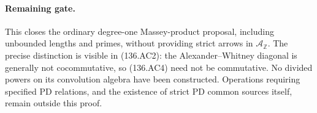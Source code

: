 \paragraph{Remaining gate.}
This closes the ordinary degree-one Massey-product
proposal, including unbounded lengths and primes,
without providing strict arrows in $\mathcal A_{\mathbb Z}$.
The precise distinction is visible in (136.AC2):
the Alexander--Whitney diagonal is generally not
cocommutative, so (136.AC4) need not be commutative.
No divided powers on its convolution algebra have
been constructed. Operations requiring specified
PD relations, and the existence of strict PD common
sources itself, remain outside this proof.
